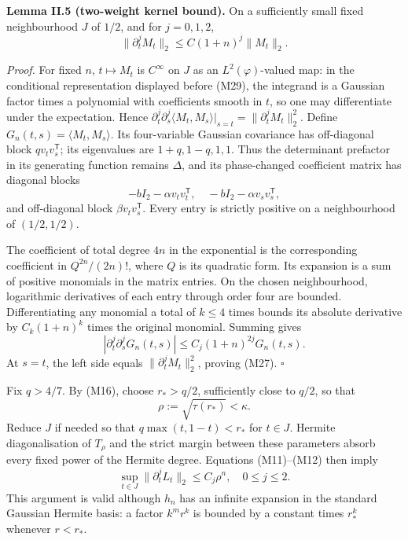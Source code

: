 \documentclass[
  british,
  10pt,
]{article}
\begin{document}
\textbf{Lemma II.5 (two-weight kernel bound).} On a sufficiently small
fixed neighbourhood \(J\) of \(1/2\), and for \(j=0,1,2\), \[
\|\partial_t^jM_t\|_2\le C(1+n)^j\|M_t\|_2.
\tag{M27}
\]

\emph{Proof.} For fixed \(n\), \(t\mapsto M_t\) is \(C^\infty\) on \(J\)
as an \(L^2(\varphi)\)-valued map: in the conditional representation
displayed before (M29), the integrand is a Gaussian factor times a
polynomial with coefficients smooth in \(t\), so one may differentiate
under the expectation. Hence
\(\partial_t^j\partial_s^j\langle M_t,M_s\rangle|_{s=t}=\|\partial_t^jM_t\|_2^2\).
Define \(G_n(t,s)=\langle M_t,M_s\rangle\). Its four-variable Gaussian
covariance has off-diagonal block \(qv_tv_s^{\mathsf T}\); its
eigenvalues are \(1+q,1-q,1,1\). Thus the determinant prefactor in its
generating function remains \(\Delta\), and its phase-changed
coefficient matrix has diagonal blocks \[
-bI_2-\alpha v_tv_t^{\mathsf T},
\quad
-bI_2-\alpha v_sv_s^{\mathsf T},
\] and off-diagonal block \(\beta v_tv_s^{\mathsf T}\). Every entry is
strictly positive on a neighbourhood of \((1/2,1/2)\).

The coefficient of total degree \(4n\) in the exponential is the
corresponding coefficient in \(Q^{2n}/(2n)!\), where \(Q\) is its
quadratic form. Its expansion is a sum of positive monomials in the
matrix entries. On the chosen neighbourhood, logarithmic derivatives of
each entry through order four are bounded. Differentiating any monomial
a total of \(k\le4\) times bounds its absolute derivative by
\(C_k(1+n)^k\) times the original monomial. Summing gives \[
|\partial_t^j\partial_s^jG_n(t,s)|
\le C_j(1+n)^{2j}G_n(t,s).
\] At \(s=t\), the left side equals \(\|\partial_t^jM_t\|_2^2\), proving
(M27). \(\square\)

Fix \(q>4/7\). By (M16), choose \(r_*>q/2\), sufficiently close to
\(q/2\), so that \[
\rho:=\sqrt{\tau(r_*)}<\kappa.
\] Reduce \(J\) if needed so that \(q\max(t,1-t)<r_*\) for \(t\in J\).
Hermite diagonalisation of \(T_\rho\) and the strict margin between
these parameters absorb every fixed power of the Hermite degree.
Equations (M11)--(M12) then imply \[
\sup_{t\in J}\|\partial_t^j L_t\|_2\le C_j\rho^n,
\quad 0\le j\le2.
\tag{M28}
\] This argument is valid although \(h_n\) has an infinite expansion in
the standard Gaussian Hermite basis: a factor \(k^m r^k\) is bounded by
a constant times \(r_*^k\) whenever \(r<r_*\).
\end{document}
